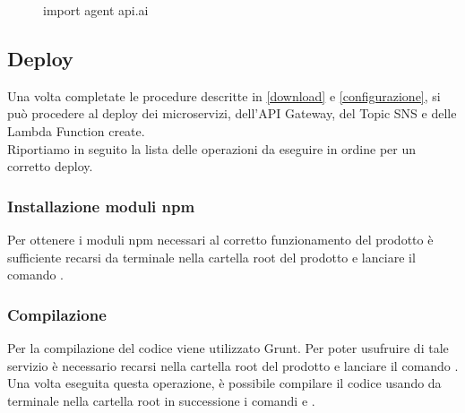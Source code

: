 \begin{figure}[h]
	\caption{import agent api.ai}\label{fig:importAgent}
\end{figure}


\subsection{Deploy}
Una volta completate le procedure descritte in \ref{download} e \ref{configurazione}, si può procedere al deploy dei microservizi, dell'API Gateway, del Topic SNS e delle Lambda Function create.\\Riportiamo in seguito la lista delle operazioni da eseguire in ordine per un corretto deploy.  

\subsubsection{Installazione moduli npm}
Per ottenere i moduli npm necessari al corretto funzionamento del prodotto è sufficiente recarsi da terminale nella cartella root del prodotto e lanciare il comando .

\subsubsection{Compilazione}
Per la compilazione del codice viene utilizzato Grunt. Per poter usufruire di tale servizio è necessario recarsi nella cartella root del prodotto e lanciare il comando .
Una volta eseguita questa operazione, è possibile compilare il codice usando da terminale nella cartella root in successione i comandi  e .


